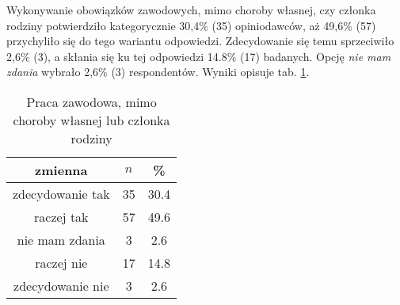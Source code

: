 

Wykonywanie obowiązków zawodowych, mimo choroby własnej, czy członka rodziny potwierdziło kategorycznie 30,4\% (35) opiniodawców, aż 49,6\% (57) przychyliło się do tego wariantu odpowiedzi. Zdecydowanie się temu sprzeciwiło 2,6\% (3), a skłania się ku tej odpowiedzi 14.8\% (17) badanych. Opcję \textit{nie mam zdania} wybrało 2,6\% (3) respondentów.
Wyniki opisuje tab. \ref{tab:Q31}.


\begin{table}[H]
\caption{Praca zawodowa, mimo choroby własnej lub członka rodziny}
\centering
\begin{tabular}{ | c | c | c |}
\hline
zmienna & $n$ & \% \\
\hline
zdecydowanie tak  &  35  & 30.4\\
\hline
raczej tak  &  57  & 49.6\\
\hline
nie mam zdania  &  3  & 2.6\\
\hline
raczej nie  &  17  & 14.8 \\
\hline
zdecydowanie nie  &  3  & 2.6 \\
\hline
\end{tabular}
\label{tab:Q31}
\end{table}
